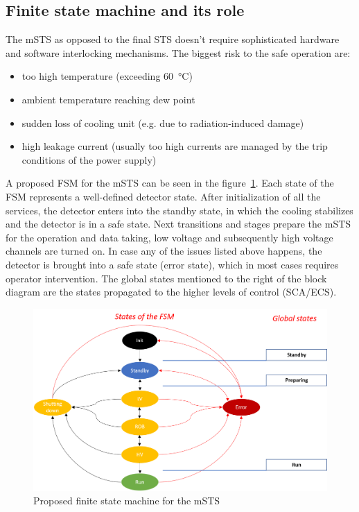 \subsection{Finite state machine and its role}
The \gls{mSTS} as opposed to the final STS doesn't require sophisticated hardware and software interlocking mechanisms. The biggest risk to the safe operation are:
\begin{itemize}
    \item too high temperature (exceeding \SI{60}{\degreeCelsius})
    \item ambient temperature reaching dew point 
    \item sudden loss of cooling unit (e.g. due to radiation-induced damage)
    \item high leakage current (usually too high currents are managed by the trip conditions of the power supply)
\end{itemize}
A proposed \gls{FSM} for the \gls{mSTS} can be seen in the figure~\ref{fig_FSM}. Each state of the \gls{FSM} represents a well-defined detector state. After initialization of all the services, the detector enters into the standby state, in which the cooling stabilizes and the detector is in a safe state. Next transitions and stages prepare the \gls{mSTS} for the operation and data taking, low voltage and subsequently high voltage channels are turned on. In case any of the issues listed above happens, the detector is brought into a safe state (error state), which in most cases requires operator intervention. The global states mentioned to the right of the block diagram are the states propagated to the higher levels of control (\gls{SCA}/\gls{ECS}).
\begin{figure}[h!]
\centering
\includegraphics[width=0.8\columnwidth]{Chapter5/DCS/images/FSM.png}
\caption{Proposed finite state machine for the \gls{mSTS}}
\label{fig_FSM}
\end{figure}

